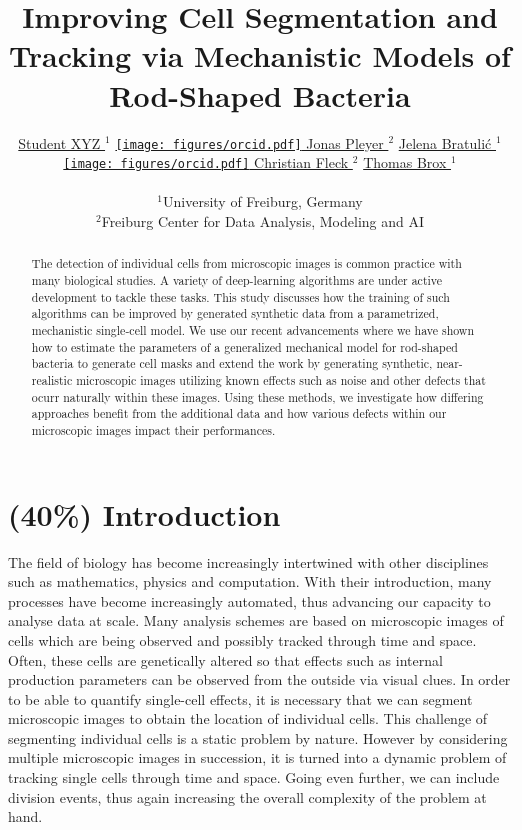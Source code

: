 \documentclass{article}
\title{Improving Cell Segmentation and Tracking via Mechanistic Models of
Rod-Shaped Bacteria}
\author{
    \href{https://orcid.org/0009-0001-0613-7978}{
        \hspace{1mm}Student XYZ
    }$^1$
    \href{https://orcid.org/0009-0001-0613-7978}{
        \texttt{[image: figures/orcid.pdf]}
        \hspace{1mm}Jonas Pleyer
    }$^2$
    \href{https://orcid.org/0009-0001-0613-7978}{
        \hspace{1mm}Jelena Bratulić
    }$^1$
	\href{https://orcid.org/0000-0002-6371-4495}{
        \texttt{[image: figures/orcid.pdf]}
        \hspace{1mm}Christian Fleck
    }$^2$
	\href{https://orcid.org/0000-0002-6371-4495}{
        \hspace{1mm}Thomas Brox
    }$^1$\\\\
    $^1$University of Freiburg, Germany\\
    $^2$Freiburg Center for Data Analysis, Modeling and AI\\
}
\begin{document}
\maketitle

\begin{abstract}
    The detection of individual cells from microscopic images is common practice with many
    biological studies.
    A variety of deep-learning algorithms are under active development to tackle these tasks.
    This study discusses how the training of such algorithms can be improved by generated synthetic
    data from a parametrized, mechanistic single-cell model.
    We use our recent advancements where we have shown how to estimate the parameters of a
    generalized mechanical model for rod-shaped bacteria to generate cell masks and extend the work
    by generating synthetic, near-realistic microscopic images utilizing known effects such as noise
    and other defects that ocurr naturally within these images.
    Using these methods, we investigate how differing approaches benefit from the additional data
    and how various defects within our microscopic images impact their performances.
\end{abstract}


\vfill
\pagebreak
\renewcommand{\contentsname}{Table of Contents (remove before submission)}
\tableofcontents
\vfill
\pagebreak

\section{(40\%) Introduction}

The field of biology has become increasingly intertwined with other disciplines such as mathematics,
physics and computation.
With their introduction, many processes have become increasingly automated, thus advancing our
capacity to analyse data at scale.
Many analysis schemes are based on microscopic images of cells which are being observed and possibly
tracked through time and space.
Often, these cells are genetically altered so that effects such as internal production parameters
can be observed from the outside via visual clues.
In order to be able to quantify single-cell effects, it is necessary that we can segment microscopic
images to obtain the location of individual cells.
This challenge of segmenting individual cells is a static problem by nature.
However by considering multiple microscopic images in succession, it is turned into a dynamic
problem of tracking single cells through time and space.
Going even further, we can include division events, thus again increasing the overall complexity of
the problem at hand.
\end{document}
